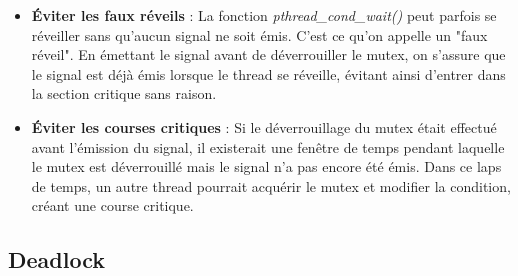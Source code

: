\begin{itemize}
    \item \textbf{Éviter les faux réveils} : La fonction \textit{pthread\_cond\_wait()} peut parfois se réveiller sans qu'aucun signal ne soit émis. C'est ce qu'on appelle un "faux réveil". En émettant le signal avant de déverrouiller le mutex, on s'assure que le signal est déjà émis lorsque le thread se réveille, évitant ainsi d'entrer dans la section critique sans raison. 
\\
    \item \textbf{Éviter les courses critiques} : Si le déverrouillage du mutex était effectué avant l'émission du signal, il existerait une fenêtre de temps pendant laquelle le mutex est déverrouillé mais le signal n'a pas encore été émis. Dans ce laps de temps, un autre thread pourrait acquérir le mutex et modifier la condition, créant une course critique.
\end{itemize}

\subsection{Deadlock}

